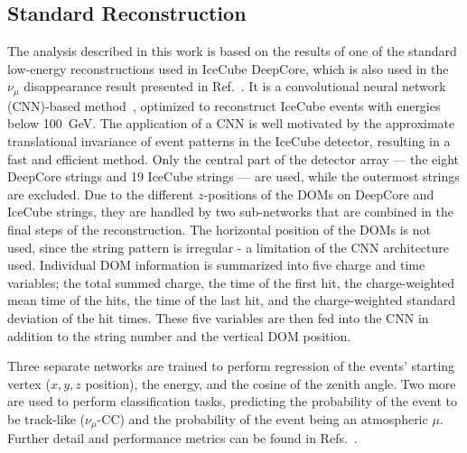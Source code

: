 \documentclass[
    aps,
    prd,
    reprint,
    amsmath,
    amssymb,
    nofootinbib,
    superscriptaddress,
    floatfix
]{revtex4-2}
\newcommand{\gev}{\giga\electronvolt}
\def\nomathut4{|U_{\tau4}|^2}
\begin{document}


\subsection{\label{sec:flercnn} Standard Reconstruction}

The analysis described in this work is based on the results of one of the standard low-energy reconstructions used in IceCube DeepCore, which is also used in the $\nu_{\mu}$ disappearance result presented in Ref.~\cite{IceCube:2024xjj}.
It is a convolutional neural network (CNN)-based method~\cite{Micallef:2022jvd, flercnn_proceedings, flercnn}, optimized to reconstruct IceCube events with energies below \SI{100}{\gev}.
The application of a CNN is well motivated by the approximate translational invariance of event patterns in the IceCube detector, resulting in a fast and efficient method.
Only the central part of the detector array --- the eight DeepCore strings and 19 IceCube strings --- are used, while the outermost strings are excluded.
Due to the different $z$-positions of the DOMs on DeepCore and IceCube strings, they are handled by two sub-networks that are combined in the final steps of the reconstruction.
The horizontal position of the DOMs is not used, since the string pattern is irregular - a limitation of the CNN architecture used.
Individual DOM information is summarized into five charge and time variables; the total summed charge, the time of the first hit, the charge-weighted mean time of the hits, the time of the last hit, and the charge-weighted standard deviation of the hit times. These five variables are then fed into the CNN in addition to the string number and the vertical DOM position.

Three separate networks are trained to perform regression of the events' starting vertex ($x,y,z$ position), the energy, and the cosine of the zenith angle.
Two more are used to perform classification tasks, predicting the probability of the event to be track-like ($\nu_\mu$-CC) and the probability of the event being an atmospheric $\mu$. Further detail and performance metrics can be found in Refs.~\cite{Micallef:2022jvd, flercnn_proceedings}.
\end{document}
